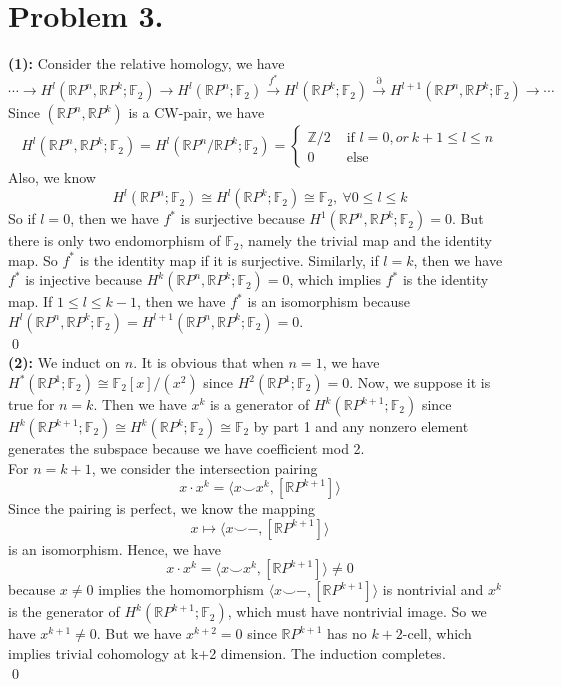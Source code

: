 \documentclass[12pt]{amsart}
\newcommand{\R}{\mathbb{R}}
\newcommand{\Z}{\mathbb{Z}}
\newcommand{\F}{\mathbb{F}}
\newcommand{\If}{\text{ if }}
\newcommand{\Else}{\text{ else}}
\begin{document}
\section*{Problem 3.}
\textbf{(1):} Consider the relative homology, we have
\[\cdots \to H^l(\R P^n,\R P^k;\F_2)\to H^l(\R P^n;\F_2)\xrightarrow[]{f^\ast}H^l(\R P^k;\F_2)\xrightarrow[]{\partial}H^{l+1}(\R P^n,\R P^k;\F_2)\to \cdots \]
Since $(\R P^n,\R P^k)$ is a CW-pair, we have
\[H^l(\R P^n,\R P^k;\F_2)=H^l(\R P^n/\R P^k;\F_2)=\begin{cases}
        \Z/2 & \If l=0, or\  k+1\leq l \leq n \\
        0    & \Else
    \end{cases}\]
Also, we know
\[H^l(\R P^n;\F_2)\cong H^l(\R P^k;\F_2)\cong \F_2,\ \forall 0\leq l\leq k\]
So if $l=0$, then we have $f^\ast$ is surjective because $H^1(\R P^n,\R P^k;\F_2)=0$. But there is only two endomorphism of $\F_2$, namely the trivial map and the identity map. So $f^\ast$ is the identity map if it is surjective. Similarly, if $l=k$, then we have $f^\ast$ is injective because $H^k(\R P^n,\R P^k;\F_2)=0$, which implies $f^\ast$ is the identity map. If $1\leq l\leq k-1$, then we have $f^\ast$ is an isomorphism because $H^l(\R P^n,\R P^k;\F_2)=H^{l+1}(\R P^n,\R P^k;\F_2)=0$.
\\\qed\\
\textbf{(2):} We induct on $n$. It is obvious that when $n=1$, we have $H^\ast(\R P^1;\F_2)\cong \F_2[x]/(x^2)$ since $H^2(\R P^1;\F_2)=0$. Now, we suppose it is true for $n=k$. Then we have $x^k$ is a generator of $H^k(\R P^{k+1};\F_2)$ since $H^k(\R P^{k+1};\F_2)\cong H^k(\R P^{k};\F_2)\cong \F_2$ by part 1 and any nonzero element generates the subspace because we have coefficient mod 2.\\
For $n=k+1$, we consider the intersection pairing
\[x\cdot x^k=\langle x\smile x^k,[\R P^{k+1}]\rangle\]
Since the pairing is perfect, we know the mapping
\[x\mapsto \langle x\smile -,[\R P^{k+1}]\rangle\]
is an isomorphism. Hence, we have
\[x\cdot x^k=\langle x\smile x^k,[\R P^{k+1}]\rangle\neq 0\]
because $x\neq 0$ implies the homomorphism $\langle x\smile -,[\R P^{k+1}]\rangle$ is nontrivial and $x^k$ is the generator of $H^k(\R P^{k+1};\F_2)$, which must have nontrivial image.
So we have $x^{k+1}\neq 0$. But we have $x^{k+2}=0$ since $\R P^{k+1}$ has no $k+2$-cell, which implies trivial cohomology at k+2 dimension. The induction completes.
\\\qed\\
\end{document}
